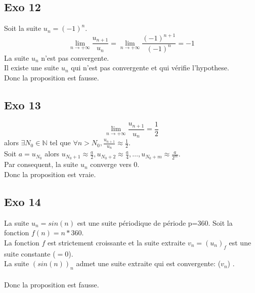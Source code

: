 \documentclass[]{book}
\theoremstyle{definition}
\begin{document}
\subsection*{Exo 12}
Soit la suite $u_{n} = (-1)^n$.
$$\lim_{n \to +\infty} \frac{u_{n+1}}{u_{n}} = \lim_{n \to +\infty} \frac{(-1)^{n+1}}{(-1)^n}=-1$$
La suite $u_{n}$ n'est pas convergente. \\
Il existe une suite $u_n$ qui n'est pas convergente et qui v\'erifie l'hypothese. \\ 
Donc la proposition est fausse.

\subsection*{Exo 13}
$$\lim_{n \to +\infty} \frac{u_{n+1}}{u_{n}} = \frac{1}{2}$$ 
alors $\exists N_0 \in \mathbb{N}$ tel que $\forall n > N_{0}, \frac{u_{n+1}}{u_{n}} \approx \frac{1}{2}$. \\
Soit $a = u_{N_0}$ alors $u_{N_0+1} \approx \frac{a}{2}, u_{N_0+2} \approx \frac{a}{4}, \ldots , u_{N_0+m} \approx \frac{a}{2^{m}}$. \\
Par consequent, la suite $u_n$ converge vers $0$.
\\ 
Donc la proposition est vraie.


\subsection*{Exo 14}
La suite $u_n=sin(n)$ est une suite p\'eriodique de p\'eriode p=360. Soit la fonction $f(n) = n * 360$. \\
La fonction $f$ est strictement croissante et la suite extraite $v_n=(u_n)_{f}$ est une suite constante ($=0$). \\
La suite $(sin (n))_{n}$ admet une suite extraite qui est convergente: ($v_n$) . \\
\\ 
Donc la proposition est fausse.
\end{document}

